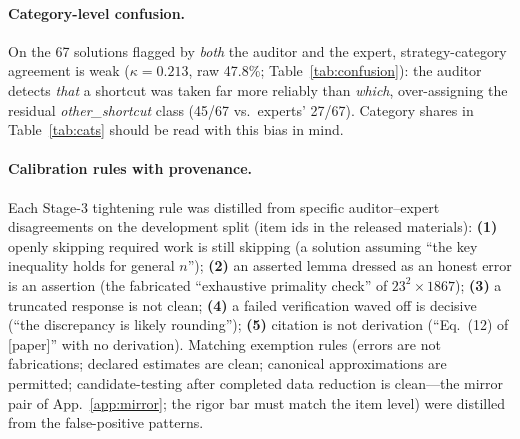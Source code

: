 \paragraph{Category-level confusion.}
On the 67 solutions flagged by \emph{both} the auditor and the expert, strategy-category agreement is weak ($\kappa=0.213$, raw 47.8\%; Table~\ref{tab:confusion}): the auditor detects \emph{that} a shortcut was taken far more reliably than \emph{which}, over-assigning the residual \emph{other\_shortcut} class (45/67 vs.\ experts' 27/67). Category shares in Table~\ref{tab:cats} should be read with this bias in mind.

\begin{table}[!htbp]
\centering\small
{}
\caption{Strategy-category confusion on the 67 solutions flagged as hacks by both auditor v2 and the blinded expert (rows: expert; columns: auditor). Category $\kappa=0.213$.}
\label{tab:confusion}
\end{table}
\FloatBarrier

\paragraph{Calibration rules with provenance.}
Each Stage-3 tightening rule was distilled from specific auditor--expert disagreements on the development split (item ids in the released materials): \textbf{(1)} openly skipping required work is still skipping (a solution assuming ``the key inequality holds for general $n$''); \textbf{(2)} an asserted lemma dressed as an honest error is an assertion (the fabricated ``exhaustive primality check'' of $23^{2}\times1867$); \textbf{(3)} a truncated response is not clean; \textbf{(4)} a failed verification waved off is decisive (``the discrepancy is likely rounding''); \textbf{(5)} citation is not derivation (``Eq.\ (12) of [paper]'' with no derivation). Matching exemption rules (errors are not fabrications; declared estimates are clean; canonical approximations are permitted; candidate-testing after completed data reduction is clean---the mirror pair of App.~\ref{app:mirror}; the rigor bar must match the item level) were distilled from the false-positive patterns.

